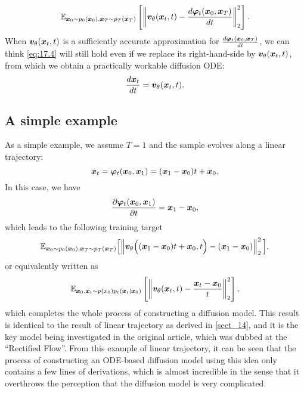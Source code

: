 \begin{equation}
    \label{eq:17.5}
    \mathbb{E}_{\bm{x}_0\sim p_{0}(\bm{x}_0),\bm{x}_T\sim p_T(\bm{x}_T)}\left[\left\|\bm{v}_\theta (\bm{x}_{t},t) - \frac{d\bm{\varphi}_{t}(\bm{x}_0,\bm{x}_T)}{dt}\right\|_2^2\right].
\end{equation}
When $\bm{v}_\theta (\bm{x}_{t},t)$ is a sufficiently accurate approximation for $\frac{d\bm{\varphi}_{t}(\bm{x}_0,\bm{x}_T)}{dt}$, we can think \cref{eq:17.4} will still hold even if we replace its right-hand-side by $\bm{v}_\theta (\bm{x}_{t},t)$, from which we obtain a practically workable diffusion ODE:
\begin{equation}
    \label{eq:17.6}
    \frac{d\bm{x}_{t}}{dt}=\bm{v}_\theta (\bm{x}_{t},t).
\end{equation}

\subsection{A simple example}
As a simple example, we assume $T=1$ and the sample evolves along a linear trajectory:
\begin{equation}
    \label{17.7}
    \bm{x}_{t}=\bm{\varphi}_t(\bm{x}_0,\bm{x}_1)=(\bm{x}_1-\bm{x}_0)t+\bm{x}_0.
\end{equation}
In this case, we have
\begin{equation}
    \label{eq:17.8}
    \frac{\partial \bm{\varphi}_t(\bm{x}_0,\bm{x}_1)}{\partial t}=\bm{x}_1-\bm{x}_0,
\end{equation}
which leads to the following training target
\begin{equation}
    \label{eq:17.9}
    \mathbb{E}_{\bm{x}_0\sim p_0(\bm{x}_0),\bm{x}_T\sim p_T(\bm{x}_T)}\Bigl[\left\| \bm{v}_{\theta}\Bigl((\bm{x}_1-\bm{x}_0)t+\bm{x}_0,t\Bigr)- (\bm{x}_1-\bm{x}_0)\right\|_2^2\Bigl],
\end{equation}
or  equivalently written as
\begin{equation}
    \label{eq:17.10}
    \mathbb{E}_{\bm{x}_0,\bm{x}_{t}\sim p(x_0)p_t(\bm{x}_{t}|\bm{x}_0)}\left[ \left\|\bm{v}_{\theta}(\bm{x}_{t},t)-\frac{\bm{x}_{t}-\bm{x}_0}{t} \right\|_2^2\right],
\end{equation}
which completes the whole process of constructing a diffusion model. This result is  identical to the result of linear trajectory as derived in \cref{sect_14}, and it is the key model being investigated in the original article, which was dubbed at the ``Rectified Flow''. From this example of  linear trajectory, it can be seen that the process of constructing an ODE-based diffusion model using this idea only contains a few lines of derivations, which is almost incredible in the sense that it overthrows the perception that the diffusion model is very complicated.

